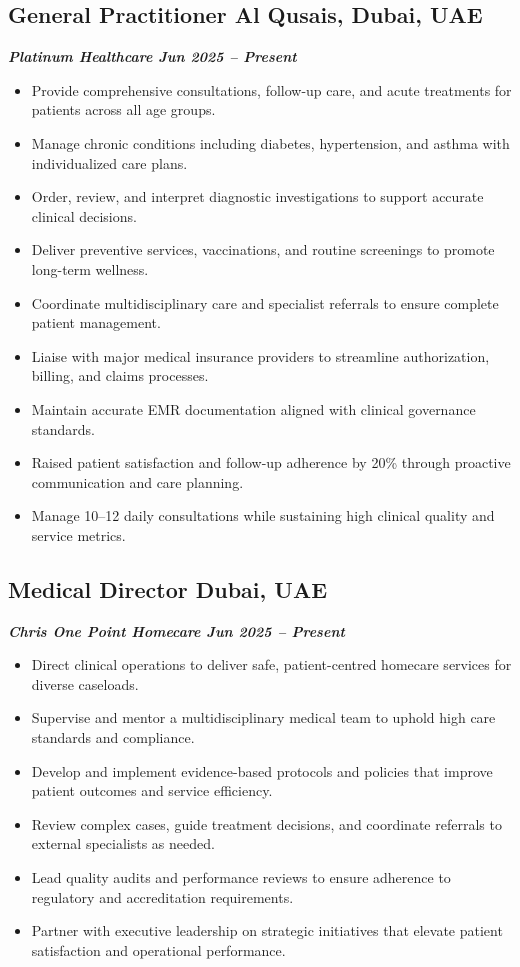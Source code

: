 \documentclass[a4paper,11pt]{article}
\begin{document}
\subsection*{General Practitioner \hfill Al Qusais, Dubai, UAE}
\vspace{-0.6em}
\textbf{\textit{Platinum Healthcare \hfill Jun 2025 -- Present}}
\vspace{-0.6em}
\begin{itemize}
    \item Provide comprehensive consultations, follow-up care, and acute treatments for patients across all age groups.
    \item Manage chronic conditions including diabetes, hypertension, and asthma with individualized care plans.
    \item Order, review, and interpret diagnostic investigations to support accurate clinical decisions.
    \item Deliver preventive services, vaccinations, and routine screenings to promote long-term wellness.
    \item Coordinate multidisciplinary care and specialist referrals to ensure complete patient management.
    \item Liaise with major medical insurance providers to streamline authorization, billing, and claims processes.
    \item Maintain accurate EMR documentation aligned with clinical governance standards.
    \item Raised patient satisfaction and follow-up adherence by 20\% through proactive communication and care planning.
    \item Manage 10--12 daily consultations while sustaining high clinical quality and service metrics.
\end{itemize}

\subsection*{Medical Director \hfill Dubai, UAE}
\vspace{-0.6em}
\textbf{\textit{Chris One Point Homecare \hfill Jun 2025 -- Present}}
\vspace{-0.6em}
\begin{itemize}
    \item Direct clinical operations to deliver safe, patient-centred homecare services for diverse caseloads.
    \item Supervise and mentor a multidisciplinary medical team to uphold high care standards and compliance.
    \item Develop and implement evidence-based protocols and policies that improve patient outcomes and service efficiency.
    \item Review complex cases, guide treatment decisions, and coordinate referrals to external specialists as needed.
    \item Lead quality audits and performance reviews to ensure adherence to regulatory and accreditation requirements.
    \item Partner with executive leadership on strategic initiatives that elevate patient satisfaction and operational performance.
\end{itemize}
\end{document}
